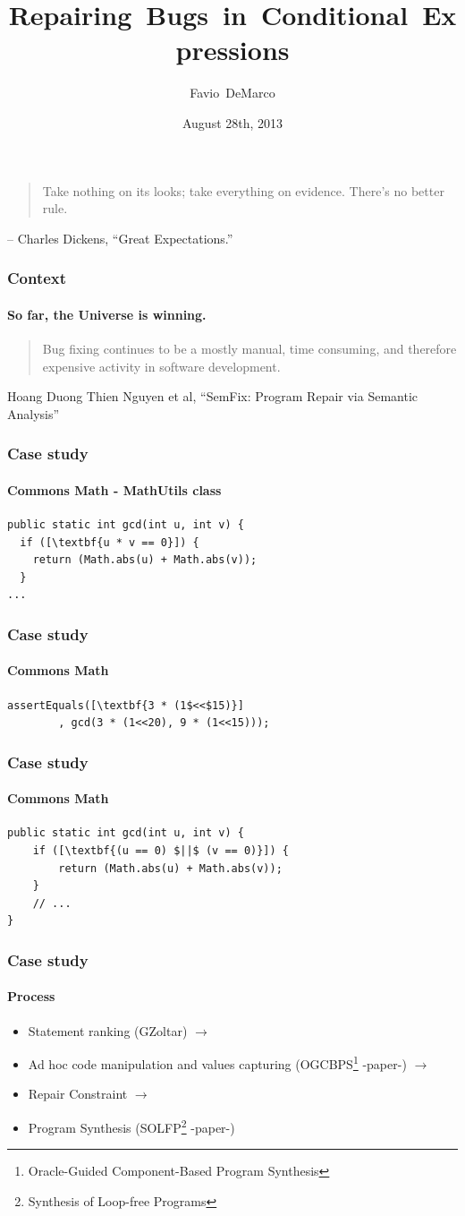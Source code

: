 \documentclass{beamer}
\title[{Repairing Bugs in Conditional Expressions}]{Repairing~Bugs~in~Conditional~Expressions}
\author[Favio DeMarco]{Favio~DeMarco}
\institute[U.B.A. - INRIA]{Universidad de Buenos Aires - INRIA}
\date[08/28/2013]{August 28th, 2013}
\begin{document}
  \frame
  {
\begin{quote}
    Take nothing on its looks; take everything on evidence. There's no better rule.
\end{quote}    
– Charles Dickens, ``Great Expectations.''
  }

\frame
  {
    \titlepage
  }

  \frame
  {
    \frametitle{Context}
    \framesubtitle{So far, the Universe is winning.}
    \begin{quote}
    Bug fixing continues to be a mostly manual, time consuming, and therefore expensive activity in software development.
    \end{quote}
    Hoang Duong Thien Nguyen et al, ``SemFix: Program Repair via Semantic Analysis''
}

 \begin{frame}[fragile]
    \frametitle{Case study}
      \framesubtitle{Commons Math - MathUtils class}
\begin{lstlisting}[escapeinside=\[\]]
public static int gcd(int u, int v) {
  if ([\textbf{u * v == 0}]) {
    return (Math.abs(u) + Math.abs(v));
  }
...
\end{lstlisting}
\end{frame}

 \begin{frame}[fragile]
    \frametitle{Case study}
      \framesubtitle{Commons Math}
        \begin{lstlisting}[escapeinside=\[\]]
assertEquals([\textbf{3 * (1$<<$15)}]
        , gcd(3 * (1<<20), 9 * (1<<15)));
	\end{lstlisting}
\end{frame}

 \begin{frame}[fragile]
    \frametitle{Case study}
      \framesubtitle{Commons Math}
        \begin{lstlisting}[escapeinside=\[\]]
public static int gcd(int u, int v) {
    if ([\textbf{(u == 0) $||$ (v == 0)}]) {
        return (Math.abs(u) + Math.abs(v));
    }
    // ...
}
	\end{lstlisting}
\end{frame}

\frame
  {  
  \frametitle{Case study}
      \framesubtitle{Process}
\begin{itemize}
\item Statement ranking (GZoltar)  $\rightarrow$
\item Ad hoc code manipulation and values capturing (OGCBPS\footnote{Oracle-Guided Component-Based Program Synthesis} -paper-) $\rightarrow$
\item Repair Constraint  $\rightarrow$
\item Program Synthesis (SOLFP\footnote{Synthesis of Loop-free Programs} -paper-)
\end{itemize}
}
\end{document}
